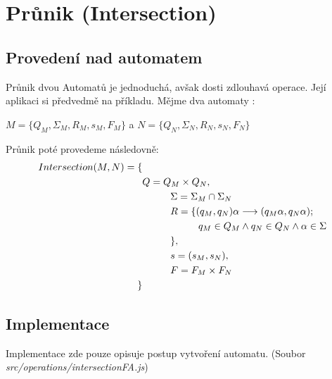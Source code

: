 \section{Průnik (Intersection)}
\subsection{Provedení nad automatem}
Průnik dvou Automatů je jednoduchá, avšak dosti zdlouhavá operace. Její aplikaci si předvedmě na příkladu.
Mějme dva automaty :

$M=\{Q_{M}, \Sigma_{M}, R_{M},s_{M}, F_{M}\}$ a $N=\{Q_{N}, \Sigma_{N}, R_{N},s_{N}, F_{N}\} $

Průnik poté provedeme následovně:
\begin{equation}
\label{eqA:Intersection2}
\begin{split}
    Intersection(M,N) = \{ &\\
          &Q = Q_{M} \times Q_{N},\\
    & \tab   \Sigma = \Sigma_{M} \cap \Sigma_{N} \\
    & \tab   R = \{ (q_{M},q_{N})\alpha \longrightarrow (q_{M}\alpha, q_{N}\alpha);\\
    & \tab\tab q_{M} \in Q_{M} \land q_{N} \in Q_{N} \land \alpha \in \Sigma\\
    & \tab\}, \\
    & \tab s = (s_{M}, s_{N}), \\
    & \tab F = F_{M} \times F_{N} \\
    \}&
\end{split}
\end{equation}

\subsection{Implementace}
Implementace zde pouze opisuje postup vytvoření automatu. (Soubor \textit{src/operations/intersectionFA.js})
